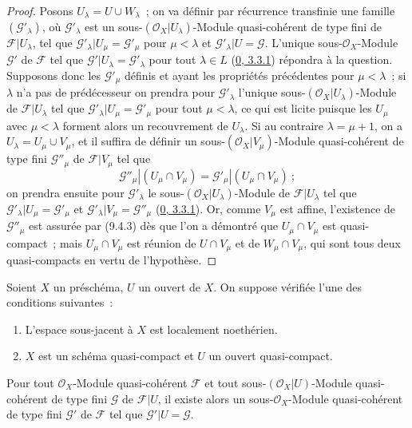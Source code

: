 \begin{proof}
Posons $U_\lambda=U\cup W_\lambda$~; on va définir par récurrence transfinie
une famille $(\mathscr{G}'_\lambda)$, où $\mathscr{G}'_\lambda$ est un
sous-$(\mathscr{O}_X|U_\lambda)$-Module quasi-cohérent de type fini de
$\mathscr{F}|U_\lambda$, tel que
$\mathscr{G}'_\lambda|U_\mu=\mathscr{G}'_\mu$ pour $\mu<\lambda$ et
$\mathscr{G}'_\lambda|U=\mathscr{G}$. L'unique sous-$\mathscr{O}_X$-Module
$\mathscr{G}'$ de $\mathscr{F}$ tel que
$\mathscr{G}'|U_\lambda=\mathscr{G}'_\lambda$ pour tout $\lambda\in L$
(\hyperref[0.3.3.1-fr]{0, 3.3.1}) répondra à la question. Supposons donc les
$\mathscr{G}'_\mu$ définis et ayant les propriétés précédentes pour
$\mu<\lambda$~; si $\lambda$ n'a pas de prédécesseur on prendra pour
$\mathscr{G}'_\lambda$ l'unique sous-$(\mathscr{O}_X|U_\lambda)$-Module de
$\mathscr{F}|U_\lambda$ tel que
$\mathscr{G}'_\lambda|U_\mu=\mathscr{G}'_\mu$ pour tout $\mu<\lambda$, ce
qui est licite puisque les $U_\mu$ avec $\mu<\lambda$ forment alors un
recouvrement de $U_\lambda$. Si au contraire $\lambda=\mu+1$, on a
$U_\lambda=U_\mu\cup V_\mu$, et il suffira de définir un
sous-$(\mathscr{O}_X|V_\mu)$-Module quasi-cohérent de type fini
$\mathscr{G}''_\mu$ de $\mathscr{F}|V_\mu$ tel que
\[
  \mathscr{G}''_\mu|(U_\mu\cap V_\mu)
  =\mathscr{G}'_\mu|(U_\mu\cap V_\mu)~;
\]
on prendra ensuite pour $\mathscr{G}'_\lambda$ le
sous-$(\mathscr{O}_X|U_\lambda)$-Module de $\mathscr{F}|U_\lambda$ tel que
$\mathscr{G}'_\lambda|U_\mu=\mathscr{G}'_\mu$ et
$\mathscr{G}'_\lambda|V_\mu=\mathscr{G}''_\mu$
(\hyperref[0.3.3.1-fr]{0, 3.3.1}). Or, comme $V_\mu$ est affine, l'existence
de $\mathscr{G}''_\mu$ est assurée par (9.4.3) dès que l'on a démontré que
$U_\mu\cap V_\mu$ est quasi-compact~; mais $U_\mu\cap V_\mu$ est réunion de
$U\cap V_\mu$ et de $W_\mu\cap V_\mu$, qui sont tous deux quasi-compacts en
vertu de l'hypothèse.
\end{proof}

\begin{theorem}[9.4.7]
\label{I.9.4.7-fr}
Soient $X$ un préschéma, $U$ un ouvert de $X$. On suppose vérifiée l'une des
conditions suivantes~:
\begin{enumerate}
  \item[(a)] L'espace sous-jacent à $X$ est localement noethérien.
  \item[(b)] $X$ est un schéma quasi-compact et $U$ un ouvert quasi-compact.
\end{enumerate}
Pour tout $\mathscr{O}_X$-Module quasi-cohérent $\mathscr{F}$ et tout
sous-$(\mathscr{O}_X|U)$-Module quasi-cohérent de type fini $\mathscr{G}$ de
$\mathscr{F}|U$, il existe alors un sous-$\mathscr{O}_X$-Module
quasi-cohérent de type fini $\mathscr{G}'$ de $\mathscr{F}$ tel que
$\mathscr{G}'|U=\mathscr{G}$.
\end{theorem}

